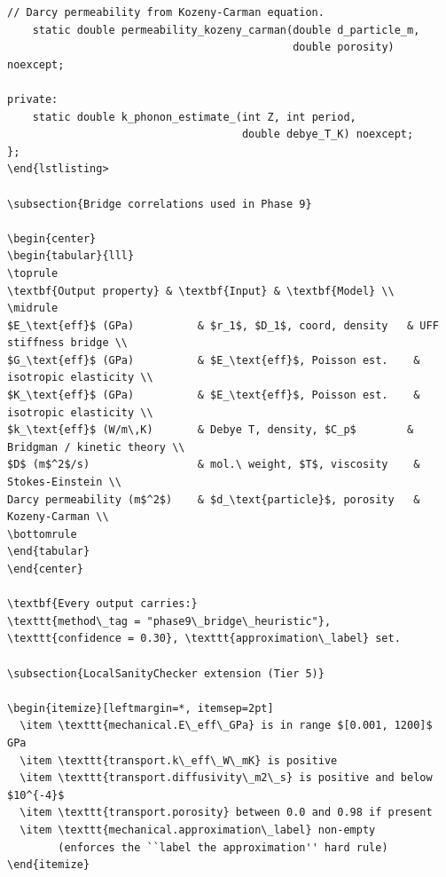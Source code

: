 \documentclass[11pt, a4paper]{article}
\begin{document}
\begin{lstlisting}[language={}]
	// Darcy permeability from Kozeny-Carman equation.
	static double permeability_kozeny_carman(double d_particle_m,
											 double porosity) noexcept;

private:
	static double k_phonon_estimate_(int Z, int period,
									 double debye_T_K) noexcept;
};
\end{lstlisting>

\subsection{Bridge correlations used in Phase 9}

\begin{center}
\begin{tabular}{lll}
\toprule
\textbf{Output property} & \textbf{Input} & \textbf{Model} \\
\midrule
$E_\text{eff}$ (GPa)          & $r_1$, $D_1$, coord, density   & UFF stiffness bridge \\
$G_\text{eff}$ (GPa)          & $E_\text{eff}$, Poisson est.    & isotropic elasticity \\
$K_\text{eff}$ (GPa)          & $E_\text{eff}$, Poisson est.    & isotropic elasticity \\
$k_\text{eff}$ (W/m\,K)       & Debye T, density, $C_p$        & Bridgman / kinetic theory \\
$D$ (m$^2$/s)                 & mol.\ weight, $T$, viscosity    & Stokes-Einstein \\
Darcy permeability (m$^2$)    & $d_\text{particle}$, porosity   & Kozeny-Carman \\
\bottomrule
\end{tabular}
\end{center}

\textbf{Every output carries:}
\texttt{method\_tag = "phase9\_bridge\_heuristic"},
\texttt{confidence = 0.30}, \texttt{approximation\_label} set.

\subsection{LocalSanityChecker extension (Tier 5)}

\begin{itemize}[leftmargin=*, itemsep=2pt]
  \item \texttt{mechanical.E\_eff\_GPa} is in range $[0.001, 1200]$ GPa
  \item \texttt{transport.k\_eff\_W\_mK} is positive
  \item \texttt{transport.diffusivity\_m2\_s} is positive and below $10^{-4}$
  \item \texttt{transport.porosity} between 0.0 and 0.98 if present
  \item \texttt{mechanical.approximation\_label} non-empty
		(enforces the ``label the approximation'' hard rule)
\end{itemize}


\end{lstlisting}
\end{document}
